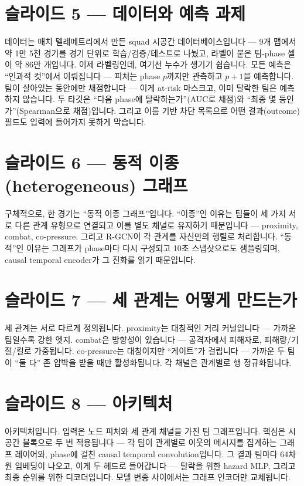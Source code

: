 \documentclass[11pt]{article}
\begin{document}
\section{슬라이드 5 --- 데이터와 예측 과제}
데이터는 매치 텔레메트리에서 만든 squad 시공간 데이터베이스입니다 --- 9개 맵에서 약 1만 5천 경기를 경기 단위로 학습/검증/테스트로 나눴고, 라벨이 붙은 팀-phase 셀이 약 86만 개입니다. 이제 라벨링인데, 여기선 누수가 생기기 쉽습니다. 모든 예측은 ``인과적 컷''에서 이뤄집니다 --- 피처는 phase $p$까지만 관측하고 $p\!+\!1$을 예측합니다. 팀이 살아있는 동안에만 채점합니다 --- 이게 at-risk 마스크고, 이미 탈락한 팀은 예측하지 않습니다. 두 타깃은 ``다음 phase에 탈락하는가''(AUC로 채점)와 ``최종 몇 등인가''(Spearman으로 채점)입니다. 그리고 이름 기반 차단 목록으로 어떤 결과(outcome) 필드도 입력에 들어가지 못하게 막습니다.

\section{슬라이드 6 --- 동적 이종(heterogeneous) 그래프}
구체적으로, 한 경기는 ``동적 이종 그래프''입니다. ``이종''인 이유는 팀들이 세 가지 서로 다른 관계 유형으로 연결되고 이를 별도 채널로 유지하기 때문입니다 --- proximity, combat, co-pressure. 그리고 R-GCN이 각 관계를 자신만의 행렬로 처리합니다. ``동적''인 이유는 그래프가 phase마다 다시 구성되고 10초 스냅샷으로도 샘플링되며, causal temporal encoder가 그 진화를 읽기 때문입니다.

\section{슬라이드 7 --- 세 관계는 어떻게 만드는가}
세 관계는 서로 다르게 정의됩니다. proximity는 대칭적인 거리 커널입니다 --- 가까운 팀일수록 강한 엣지. combat은 방향성이 있습니다 --- 공격자에서 피해자로, 피해량/기절/킬로 가중됩니다. co-pressure는 대칭이지만 ``게이트''가 걸립니다 --- 가까운 두 팀이 ``둘 다'' 존 압박을 받을 때만 활성화됩니다. 각 채널은 관계별로 행 정규화됩니다.

\section{슬라이드 8 --- 아키텍처}
아키텍처입니다. 입력은 노드 피처와 세 관계 채널을 가진 팀 그래프입니다. 핵심은 시공간 블록으로 두 번 적용됩니다 --- 각 팀이 관계별로 이웃의 메시지를 집계하는 그래프 레이어와, phase에 걸친 causal temporal convolution입니다. 그 결과 팀마다 64차원 임베딩이 나오고, 이게 두 헤드로 들어갑니다 --- 탈락을 위한 hazard MLP, 그리고 최종 순위를 위한 디코더입니다. 모델 변종 사이에서는 그래프 인코더만 교체됩니다.
\end{document}
